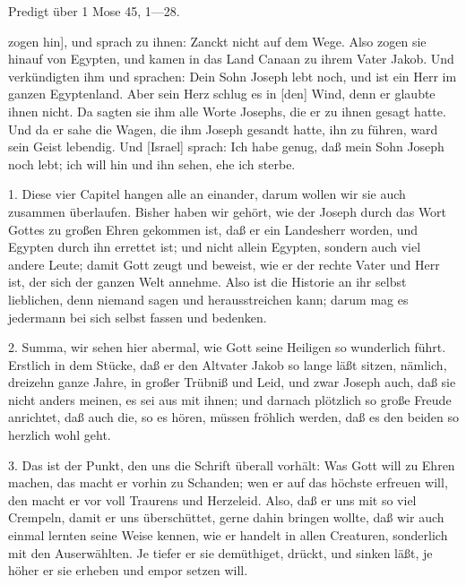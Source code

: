 Predigt über 1 Mose 45, 1—28.


zogen hin], und sprach zu ihnen: Zanckt nicht auf dem Wege. Also zogen sie hinauf von Egypten, und kamen in das Land Canaan zu ihrem Vater Jakob. Und verkündigten ihm und sprachen: Dein Sohn Joseph lebt noch, und ist ein Herr im ganzen Egyptenland. Aber sein Herz schlug es in [den] Wind, denn er glaubte ihnen nicht. Da sagten sie ihm alle Worte Josephs, die er zu ihnen gesagt hatte. Und da er sahe die Wagen, die ihm Joseph gesandt hatte, ihn zu führen, ward sein Geist lebendig. Und [Israel] sprach: Ich habe genug, daß mein Sohn Joseph noch lebt; ich will hin und ihn sehen, ehe ich sterbe.

1. Diese vier Capitel hangen alle an einander, darum wollen wir sie auch zusammen überlaufen. Bisher haben wir gehört, wie der Joseph durch das Wort Gottes zu großen Ehren gekommen ist, daß er ein Landesherr worden, und Egypten durch ihn errettet ist; und nicht allein Egypten, sondern auch viel andere Leute; damit Gott zeugt und beweist, wie er der rechte Vater und Herr ist, der sich der ganzen Welt annehme. Also ist die Historie an ihr selbst lieblichen, denn niemand sagen und herausstreichen kann; darum mag es jedermann bei sich selbst fassen und bedenken.

2. Summa, wir sehen hier abermal, wie Gott seine Heiligen so wunderlich führt. Erstlich in dem Stücke, daß er den Altvater Jakob so lange läßt sitzen, nämlich, dreizehn ganze Jahre, in großer Trübniß und Leid, und zwar Joseph auch, daß sie nicht anders meinen, es sei aus mit ihnen; und darnach plötzlich so große Freude anrichtet, daß auch die, so es hören, müssen fröhlich werden, daß es den beiden so herzlich wohl geht.

3. Das ist der Punkt, den uns die Schrift überall vorhält: Was Gott will zu Ehren machen, das macht er vorhin zu Schanden; wen er auf das höchste erfreuen will, den macht er vor voll Traurens und Herzeleid. Also, daß er uns mit so viel Crempeln, damit er uns überschüttet, gerne dahin bringen wollte, daß wir auch einmal lernten seine Weise kennen, wie er handelt in allen Creaturen, sonderlich mit den Auserwählten. Je tiefer er sie demüthiget, drückt, und sinken läßt, je höher er sie erheben und empor setzen will.


